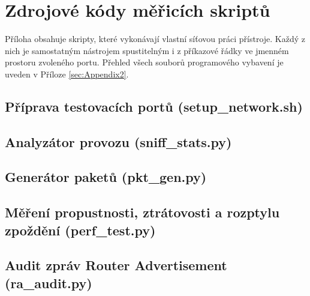 \chapter{Zdrojové kódy měřicích skriptů}
\label{sec:Appendix1}

Příloha obsahuje skripty, které vykonávají vlastní síťovou práci přístroje. Každý z nich je samostatným nástrojem spustitelným i z příkazové řádky ve jmenném prostoru zvoleného portu. Přehled všech souborů programového vybavení je uveden v Příloze \ref{sec:Appendix2}.

\section*{Příprava testovacích portů (setup\_network.sh)}


\section*{Analyzátor provozu (sniff\_stats.py)}


\section*{Generátor paketů (pkt\_gen.py)}


\section*{Měření propustnosti, ztrátovosti a rozptylu zpoždění (perf\_test.py)}


\section*{Audit zpráv Router Advertisement (ra\_audit.py)}



